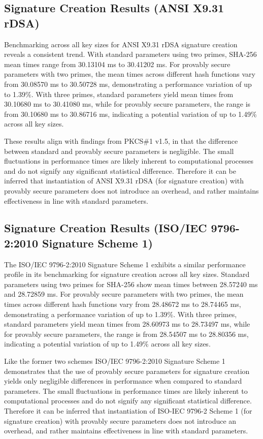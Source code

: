 \documentclass[]{final_report}
\theoremstyle{definition}
\begin{document}
\subsection{Signature Creation Results (ANSI X9.31 rDSA)}

Benchmarking across all key sizes for ANSI X9.31 rDSA signature creation reveals a consistent trend. With standard parameters using two primes, SHA-256 mean times range from 30.13104 ms to 30.41202 ms. For provably secure parameters with two primes, the mean times across different hash functions vary from 30.08570 ms to 30.50728 ms, demonstrating a performance variation of up to 1.39\%. With three primes, standard parameters yield mean times from 30.10680 ms to 30.41080 ms, while for provably secure parameters, the range is from 30.10680 ms to 30.86716 ms, indicating a potential variation of up to 1.49\% across all key sizes.


These results align with findings from PKCS\#1 v1.5, in that the difference between standard and provably secure parameters is negligible. The small fluctuations in performance times are likely inherent to computational processes and do not signify any significant statistical difference. Therefore it can be inferred that instantiation of ANSI X9.31 rDSA (for signature creation) with provably secure parameters does not introduce an overhead, and rather maintains effectiveness in line with standard parameters.

\subsection{Signature Creation Results (ISO/IEC 9796-2:2010 Signature Scheme 1)}

The ISO/IEC 9796-2:2010 Signature Scheme 1 exhibits a similar performance profile in its benchmarking for signature creation across all key sizes. Standard parameters using two primes for SHA-256 show mean times between 28.57240 ms and 28.72859 ms. For provably secure parameters with two primes, the mean times across different hash functions vary from 28.48672 ms to 28.74465 ms, demonstrating a performance variation of up to 1.39\%. With three primes, standard parameters yield mean times from 28.60973 ms to 28.73497 ms, while for provably secure parameters, the range is from 28.54507 ms to 28.80356 ms, indicating a potential variation of up to 1.49\% across all key sizes.


Like the former two schemes ISO/IEC 9796-2:2010 Signature Scheme 1 demonstrates that the use of provably secure parameters for signature creation yields only negligible differences in performance when compared to standard parameters.  The small fluctuations in performance times are likely inherent to computational processes and do not signify any significant statistical difference. Therefore it can be inferred that instantiation of ISO-IEC 9796-2 Scheme 1 (for signature creation) with provably secure parameters does not introduce an overhead, and rather maintains effectiveness in line with standard parameters.
\end{document}
